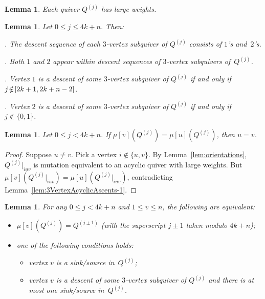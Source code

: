 \documentclass[11pt, letterpaper]{amsart}
\newtheorem{lemma}[theorem]{Lemma}
\theoremstyle{definition}
\numberwithin{equation}{section}
\newcommand{\T}[2]{\mu[#1](#2)} %
\begin{document}
\begin{lemma}
\label{lem:Qj-large}
Each quiver $Q^{(j)}$ has large weights.
\end{lemma}

\begin{lemma}
\label{lem:descents}
Let $0\le j \le 4k+n$. Then: 

. The descent sequence of each $3$-vertex subquiver of $Q^{(j)}$ consists of $1$'s and~$2$'s. 

. Both $1$ and $2$ appear within descent sequences of $3$-vertex subquivers of~$Q^{(j)}$. 

.  Vertex $1$ is a descent of some $3$-vertex subquiver of $Q^{(j)}$ if and only if $j \!\notin\! [{2k+1}, \linebreak[3]
2k+n-2]$. 

. Vertex $2$ is a descent of some $3$-vertex subquiver of $Q^{(j)}$ if and only if $j \not \in \{0, 1\}$.
\end{lemma}

\pagebreak[3]

\begin{lemma}
\label{lem:no2cycles}
Let $ 0 \leq j < 4k+n$. 
If $\T{v}{Q^{(j)}}=\T{u}{Q^{(j)}}$, then $u=v$.
\end{lemma}
\begin{proof}
Suppose $u\ne v$. Pick a vertex $i \notin \{u,v\}$.  
By Lemma~\ref{lem:orientations}, $Q^{(j)}|_{iuv}$ is mutation equivalent to an acyclic quiver with large weights.
But $\T{v}{Q^{(j)}|_{iuv}} = \T{u}{Q^{(j)}|_{iuv}}$,  contradicting Lemma~\ref{lem:3VertexAcyclicAscents-1}.
\end{proof}

\begin{lemma}
\label{lem:cycleIsSinksAndDescents}
For any $0 \le j < 4k+n$ and $1 \le v \le n$, the following are equivalent:

\begin{itemize}[leftmargin=.55in]
\item[\rm(\ref{lem:cycleIsSinksAndDescents}a)]
$\T{v}{Q^{(j)}} = Q^{(j \pm 1)}$ (with the superscript $j\pm 1$ taken modulo $4k+n$);
\item[\rm(\ref{lem:cycleIsSinksAndDescents}b)]
one of the following conditions holds: 
\begin{itemize}[leftmargin=.2in]
\item vertex $v$ is a sink/source in~$Q^{(j)}$; 
\item vertex $v$ is a descent of some $3$-vertex subquiver of $Q^{(j)}$ and there is at most one sink/source in~$Q^{(j)}$.
\end{itemize}
\end{itemize}
\end{lemma}
\end{document}
